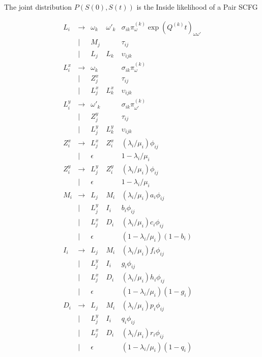 \documentclass{article}
\begin{document}
The joint distribution $P(S(0),S(t))$ is the Inside likelihood of a Pair SCFG

\[
\begin{array}{rclll}
  L_i & \to & \omega_k & \omega'_k & \sigma_{ik} \pi^{(k)}_{\omega} \exp(Q^{(k)} t)_{\omega \omega'} \\
      & | & M_j & & \tau_{ij} \\
      & | & L_j & L_k & \upsilon_{ijk} \\
  L^x_i & \to & \omega_k & & \sigma_{ik} \pi^{(k)}_{\omega} \\
      & | & Z^x_j & & \tau_{ij} \\
      & | & L^x_j & L^x_k & \upsilon_{ijk} \\
  L^y_i & \to & \omega'_k & & \sigma_{ik} \pi^{(k)}_{\omega'} \\
      & | & Z^y_j & & \tau_{ij} \\
      & | & L^y_j & L^y_k & \upsilon_{ijk} \\
  Z^x_i & \to & L^x_j & Z^x_i & (\lambda_i/\mu_i) \phi_{ij} \\
        & | & \epsilon & & 1 - \lambda_i/\mu_i \\
  Z^y_i & \to & L^y_j & Z^y_i & (\lambda_i/\mu_i) \phi_{ij} \\
        & | & \epsilon & & 1 - \lambda_i/\mu_i \\
M_i & \to & L_j & M_i & (\lambda_i/\mu_i) a_i \phi_{ij} \\
      & | & L^y_j & I_i & b_i \phi_{ij} \\
      & | & L^x_j & D_i & (\lambda_i/\mu_i) c_i \phi_{ij} \\
      & | & \epsilon & & (1 - \lambda_i/\mu_i) (1-b_i) \\
  I_i & \to & L_j & M_i & (\lambda_i/\mu_i) f_i \phi_{ij} \\
      & | & L^y_j & I_i & g_i \phi_{ij} \\
      & | & L^x_j & D_i & (\lambda_i/\mu_i) h_i \phi_{ij} \\
      & | & \epsilon & & (1 - \lambda_i/\mu_i) (1-g_i) \\
  D_i & \to & L_j & M_i & (\lambda_i/\mu_i) p_i \phi_{ij} \\
      & | & L^y_j & I_i & q_i \phi_{ij} \\
      & | & L^x_j & D_i & (\lambda_i/\mu_i) r_i \phi_{ij} \\
      & | & \epsilon & & (1 - \lambda_i/\mu_i) (1-q_i) \\
\end{array}
\]



\end{document}
